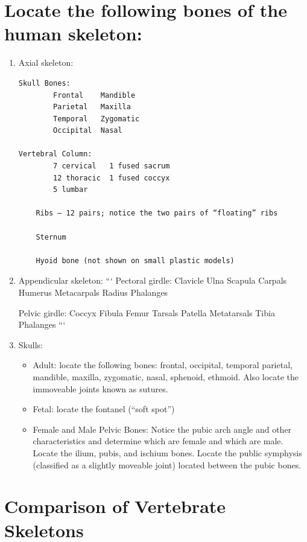 \documentclass[]{book}
\begin{document}
\hypertarget{locate-the-following-bones-of-the-human-skeleton}{%
\section{Locate the following bones of the human skeleton:}\label{locate-the-following-bones-of-the-human-skeleton}}

\begin{enumerate}
\def\labelenumi{\arabic{enumi}.}
\item
  Axial skeleton:

\begin{verbatim}
Skull Bones:
        Frontal    Mandible
        Parietal   Maxilla
        Temporal   Zygomatic
        Occipital  Nasal

Vertebral Column:
        7 cervical   1 fused sacrum
        12 thoracic  1 fused coccyx
        5 lumbar

    Ribs – 12 pairs; notice the two pairs of “floating” ribs

    Sternum

    Hyoid bone (not shown on small plastic models)
\end{verbatim}
\item
  Appendicular skeleton:
  ```
  Pectoral girdle:
  Clavicle Ulna
  Scapula Carpals
  Humerus Metacarpals
  Radius Phalanges

  Pelvic girdle:
  Coccyx Fibula
  Femur Tarsals
  Patella Metatarsals
  Tibia Phalanges
  ```
\item
  Skulls:

  \begin{itemize}
  \item
    Adult: locate the following bones: frontal, occipital, temporal parietal, mandible, maxilla, zygomatic, nasal, sphenoid, ethmoid. Also locate the immoveable joints known as sutures.
  \item
    Fetal: locate the fontanel (``soft spot'')
  \item
    Female and Male Pelvic Bones: Notice the pubic arch angle and other characteristics and determine which are female and which are male. Locate the ilium, pubis, and ischium bones. Locate the public symphysis (classified as a slightly moveable joint) located between the pubic bones.
  \end{itemize}
\end{enumerate}

\hypertarget{comparison-of-vertebrate-skeletons}{%
\section{Comparison of Vertebrate Skeletons}\label{comparison-of-vertebrate-skeletons}}
\end{document}
